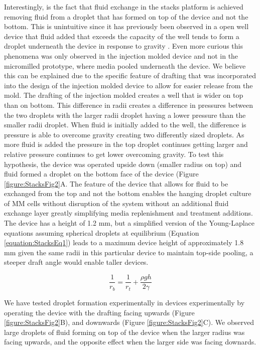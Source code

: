 Interestingly, is the fact that fluid exchange in the stacks platform is achieved removing fluid from a droplet that has formed on top of the device and not the bottom. This is unintuitive since it has previously been observed in a open well device that fluid added that exceeds the capacity of the well tends to form a droplet underneath the device in response to gravity \cite{DeGroot2016}. Even more curious this phenomena was only observed in the injection molded device and not in the micromilled prototype, where media pooled underneath the device. We believe this can be explained due to the specific feature of drafting that was incorporated into the design of the injection molded device to allow for easier release from the mold. The drafting of the injection molded creates a well that is wider on top than on bottom. This difference in radii creates a difference in pressures between the two droplets with the larger radii droplet having a lower pressure than the smaller radii droplet. 
When fluid is initially added to the well, the difference is pressure is able to overcome gravity creating two differently sized droplets. As more fluid is added the pressure in the top droplet continues getting larger and relative pressure continues to get lower overcoming gravity. To test this hypothesis, the device was operated upside down (smaller radius on top) and fluid formed a droplet on the bottom face of the device (Figure \ref{figure:StacksFig2}A. The feature of the device that allows for fluid to be exchanged from the top and not the bottom enables the hanging droplet culture of MM cells without disruption of the system without an additional fluid exchange layer greatly simplifying media replenishment and treatment additions. The device has a height of 1.2 mm, but a simplified version of the Young-Laplace equations assuming spherical droplets at equilibrium (Equation \ref{equation:StacksEq1}) leads to a maximum device height of approximately 1.8 mm given the same radii in this particular device to maintain top-side pooling, a steeper draft angle would enable taller devices. 

\begin{equation}
    \frac{1}{r_{b}} = \frac{1}{r_{t}}+ \frac{\rho gh}{2\gamma}
    \label{equation:StacksEq1}
\end{equation}

We have tested droplet formation experimentally in devices experimentally by operating the device with the drafting facing upwards (Figure \ref{figure:StacksFig2}B), and downwards (Figure \ref{figure:StacksFig2}C). We observed large droplets of fluid forming on top of the device when the larger radius was facing upwards, and the opposite effect when the larger side was facing downards.

